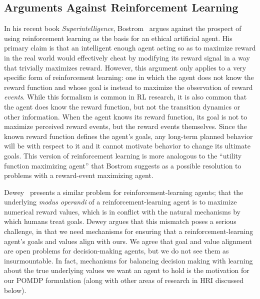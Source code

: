 \documentclass[11pt]{article}
\begin{document}
\subsection{Arguments Against Reinforcement Learning}
In his recent book {\it Superintelligence}, Bostrom~ argues against the prospect of using reinforcement learning as the basis for an ethical artificial agent. His primary claim is that an intelligent enough agent acting so as to maximize reward in the real world would effectively cheat by modifying its reward signal in a way that trivially maximizes reward. However, this argument only applies to a very specific form of reinforcement learning: one in which the agent does not know the reward function and whose goal is instead to maximize the observation of reward {\em events}. While this formalism is common in RL research, it is also common that the agent does know the reward function, but not the transition dynamics or other information. When the agent knows its reward function, its goal is not to maximize perceived reward events, but the reward events themselves. Since the known reward function defines the agent's goals, any long-term planned behavior will be with respect to it and it cannot motivate behavior to change its ultimate goals. This version of reinforcement learning is more analogous to the ``utility function maximizing agent'' that Bostrom suggests as a possible resolution to problems with a reward-event maximizing agent.

Dewey~ presents a similar problem for reinforcement-learning agents; that the underlying {\it modus operandi} of a reinforcement-learning agent is to maximize numerical reward values, which is in conflict with the natural mechanisms by which humans treat goals. Dewey argues that this mismatch poses a serious challenge, in that we need mechanisms for ensuring that a reinforcement-learning agent's goals and values align with ours. We agree that goal and value alignment are open problems for decision-making agents, but we do not see them as insurmountable.
In fact, mechanisms for balancing decision making with learning about the true underlying values we want an agent to hold is the motivation for our POMDP formulation (along with other areas of research in HRI discussed below).

\end{document}
